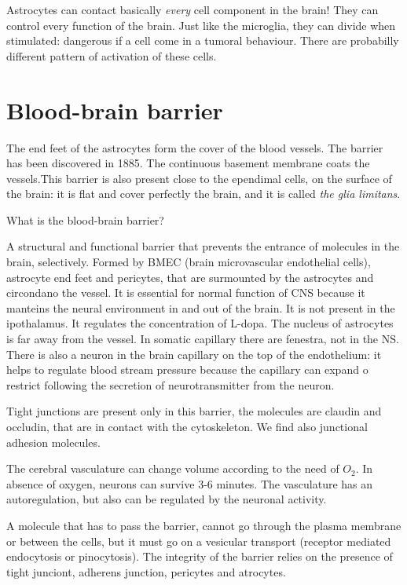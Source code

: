 \documentclass[a4paper, 12pt]{book}
\begin{document}
Astrocytes can contact basically \emph{every} cell component in the brain! They can control every function of the brain. Just like the microglia, they can divide when stimulated: dangerous if a cell come in a tumoral behaviour. There are probabilly different pattern of activation of these cells.

\section{Blood-brain barrier}
The end feet of the astrocytes form the cover of the blood vessels. The barrier has been discovered in 1885. The continuous basement membrane coats the vessels.This barrier is also present close to the ependimal cells, on the surface of the brain: it is flat and cover perfectly the brain, and it is called \emph{the glia limitans}.

What is the blood-brain barrier?

A structural and functional barrier that prevents the entrance of molecules in the brain, selectively. Formed by BMEC (brain microvascular endothelial cells), astrocyte end feet and pericytes, that are surmounted by the astrocytes and circondano the vessel. It is essential for normal function of CNS because it manteins the neural environment in and out of the brain. It is not present in the ipothalamus. It regulates the concentration of L-dopa.
The nucleus of astrocytes is far away from the vessel. In somatic capillary there are fenestra, not in the NS. There is also a neuron in the brain capillary on the top of the endothelium: it helps to regulate blood stream pressure because the capillary can expand o restrict following the secretion of neurotransmitter from the neuron. 

Tight junctions are present only in this barrier, the molecules are claudin and occludin, that are in contact with the cytoskeleton. We find also junctional adhesion molecules.

The cerebral vasculature can change volume according to the need of $O_2$. In absence of oxygen, neurons can survive 3-6 minutes. The vasculature has an autoregulation, but also can be regulated by the neuronal activity.

A molecule that has to pass the barrier, cannot go through the plasma membrane or between the cells, but it must go on a vesicular transport (receptor mediated endocytosis or pinocytosis). The integrity of the barrier relies on the presence of tight junciont, adherens junction, pericytes and atrocytes.
\end{document}
